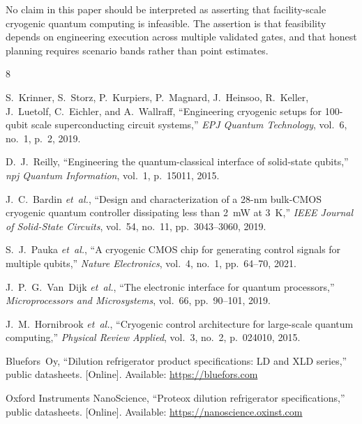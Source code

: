 \documentclass[conference]{IEEEtran}
\begin{document}
No claim in this paper should be interpreted as asserting that facility-scale cryogenic quantum computing is infeasible. The assertion is that feasibility depends on engineering execution across multiple validated gates, and that honest planning requires scenario bands rather than point estimates.

\begin{thebibliography}{8}

S.~Krinner, S.~Storz, P.~Kurpiers, P.~Magnard, J.~Heinsoo, R.~Keller, J.~Luetolf, C.~Eichler, and A.~Wallraff, ``Engineering cryogenic setups for 100-qubit scale superconducting circuit systems,'' \emph{EPJ Quantum Technology}, vol.~6, no.~1, p.~2, 2019.

D.~J.~Reilly, ``Engineering the quantum-classical interface of solid-state qubits,'' \emph{npj Quantum Information}, vol.~1, p.~15011, 2015.

J.~C.~Bardin \emph{et~al.}, ``Design and characterization of a 28-nm bulk-CMOS cryogenic quantum controller dissipating less than 2~mW at 3~K,'' \emph{IEEE Journal of Solid-State Circuits}, vol.~54, no.~11, pp.~3043--3060, 2019.

S.~J.~Pauka \emph{et~al.}, ``A cryogenic CMOS chip for generating control signals for multiple qubits,'' \emph{Nature Electronics}, vol.~4, no.~1, pp.~64--70, 2021.

J.~P.~G.~Van~Dijk \emph{et~al.}, ``The electronic interface for quantum processors,'' \emph{Microprocessors and Microsystems}, vol.~66, pp.~90--101, 2019.

J.~M.~Hornibrook \emph{et~al.}, ``Cryogenic control architecture for large-scale quantum computing,'' \emph{Physical Review Applied}, vol.~3, no.~2, p.~024010, 2015.

Bluefors~Oy, ``Dilution refrigerator product specifications: LD and XLD series,'' public datasheets. [Online]. Available: \url{https://bluefors.com}

Oxford Instruments NanoScience, ``Proteox dilution refrigerator specifications,'' public datasheets. [Online]. Available: \url{https://nanoscience.oxinst.com}

\end{thebibliography}
\end{document}
